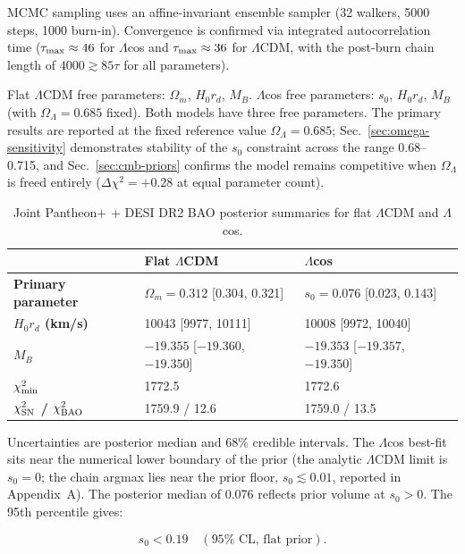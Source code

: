 \documentclass[
  aps,
  prd,
  onecolumn,         %
  nofootinbib,
  longbibliography
]{revtex4-2}
\begin{document}
MCMC sampling uses an affine-invariant ensemble sampler (32 walkers,
5000 steps, 1000 burn-in). Convergence is confirmed via integrated
autocorrelation time ($\tau_{\rm max} \approx 46$ for $\Lambda$cos and $\tau_{\rm max} \approx 36$ for $\Lambda$CDM,
with the post-burn chain length of $4000 \gtrsim 85\tau$ for all parameters).

Flat $\Lambda$CDM free parameters: $\Omega_m$, $H_0 r_d$, $M_B$. $\Lambda$cos free parameters: $s_0$,
$H_0 r_d$, $M_B$ (with $\Omega_\Lambda = 0.685$ fixed). Both models have three free
parameters. The primary results are reported at the fixed reference
value $\Omega_\Lambda = 0.685$; Sec.~\ref{sec:omega-sensitivity} demonstrates stability of the $s_0$ constraint
across the range 0.68--0.715, and Sec.~\ref{sec:cmb-priors} confirms the model remains
competitive when $\Omega_\Lambda$ is freed entirely ($\Delta\chi^2 = +0.28$ at equal parameter
count).

\begin{table}[!ht]
\centering\footnotesize
\caption{Joint Pantheon$+$ + DESI DR2 BAO posterior summaries for flat $\Lambda$CDM and $\Lambda$cos.}\label{tab:primary-fit}
\begin{tabular}{@{}lll@{}}
\toprule
 & Flat $\Lambda$CDM & $\Lambda$cos \\
\midrule

\textbf{Primary parameter} & $\Omega_m = 0.312$ [0.304, 0.321] & $s_0 =
0.076$ [0.023, 0.143] \\
\textbf{$H_0 r_d$ (km/s)} & 10043 [9977, 10111] & 10008 [9972,
10040] \\
\textbf{$M_B$} & $-19.355$ [$-19.360$, $-19.350$] & $-19.353$ [$-19.357$,
$-19.350$] \\
\textbf{$\chi^2_{\rm min}$} & 1772.5 & 1772.6 \\
\textbf{$\chi^2_{\rm SN}$ / $\chi^2_{\rm BAO}$} & 1759.9 / 12.6 & 1759.0 / 13.5 \\
\bottomrule
\end{tabular}
\end{table}

Uncertainties are posterior median and 68\% credible intervals. The $\Lambda$cos
best-fit sits near the numerical lower boundary of the prior (the
analytic $\Lambda$CDM limit is $s_0 = 0$; the chain argmax lies near the
prior floor, $s_0 \lesssim 0.01$, reported in Appendix~A). The posterior median of 0.076 reflects
prior volume at $s_0 > 0$. The 95th percentile gives:

\[s_0 < 0.19 \quad (95\% \text{ CL, flat prior}).\]
\end{document}
